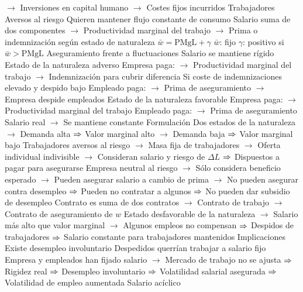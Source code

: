 \documentclass{nuevotema}
\begin{document}
\begin{esquemal}
				\4[] $\to$ Inversiones en capital humano
				\4[] $\to$ Costes fijos incurridos
				\4 Trabajadores
				\4[] Aversos al riesgo
				\4[] Quieren mantener flujo constante de consumo
				\4 Salario suma de dos componentes
				\4[] $\to$ Productividad marginal del trabajo
				\4[] $\to$ Prima o indemnización según estado de naturaleza
				\4[$\Rightarrow$] $\bar{w} = \text{PMgL} + \gamma$
				\4[] $\bar{w}$: fijo
				\4[] $\gamma$: positivo si $\bar{w} > \text{PMgL}$
				\4[$\then$] Aseguramiento frente a fluctuaciones
				\4[$\then$] Salario se mantiene rígido
				\4 Estado de la naturaleza adverso
				\4[] Empresa paga:
				\4[] $\to$ Productividad marginal del trabajo
				\4[] $\to$ Indemnización para cubrir diferencia
				\4[] Si coste de indemnizaciones elevado y despido bajo
				\4[] Empleado paga:
				\4[] $\to$ Prima de aseguramiento
				\4[] $\to$ Empresa despide empleados
				\4 Estado de la naturaleza favorable
				\4[] Empresa paga:
				\4[] $\to$ Productividad marginal del trabajo
				\4[] Empleado paga:
				\4[] $\to$ Prima de aseguramiento
				\4[] Salario real
				\4[] $\to$ Se mantiene constante
				\4 Formulación
				\4[] Dos estados de la naturaleza
				\4[] $\to$ Demanda alta $\then$ Valor marginal alto
				\4[] $\to$ Demanda baja $\then$ Valor marginal bajo
				\4[] Trabajadores aversos al riesgo
				\4[] $\to$ Masa fija de trabajadores
				\4[] $\to$ Oferta individual indivisible
				\4[] $\to$ Consideran salario y riesgo de $\Delta L$
				\4[] $\then$ Dispuestos a pagar para asegurarse
				\4[] Empresa neutral al riesgo
				\4[] $\to$ Sólo considera beneficio esperado
				\4[] $\to$ Pueden asegurar salario a cambio de prima
				\4[] $\to$ No pueden asegurar contra desempleo
				\4[] $\then$ Pueden no contratar a algunos
				\4[] $\then$ No pueden dar subsidio de desempleo
				\4[] Contrato es suma de dos contratos
				\4[] $\to$ Contrato de trabajo
				\4[] $\to$ Contrato de aseguramiento de $w$
				\4[] Estado desfavorable de la naturaleza
				\4[] $\to$ Salario más alto que valor marginal
				\4[] $\to$ Algunos empleos no compensan
				\4[] $\then$ Despidos de trabajadores
				\4[] $\then$ Salario constante para trabajadores mantenidos
				\4 Implicaciones
				\4[] Existe desempleo involuntario
				\4[] Despedidos querrían trabajar a salario fijo
				\4[] Empresa y empleados han fijado salario
				\4[] $\to$ Mercado de trabajo no se ajusta
				\4[] $\then$ Rigidez real
				\4[] $\then$ Desempleo involuntario
				\4[] $\then$ Volatilidad salarial asegurada
				\4[] $\then$ Volatilidad de empleo aumentada
				\4[] Salario acíclico

\end{esquemal}
\end{document}
